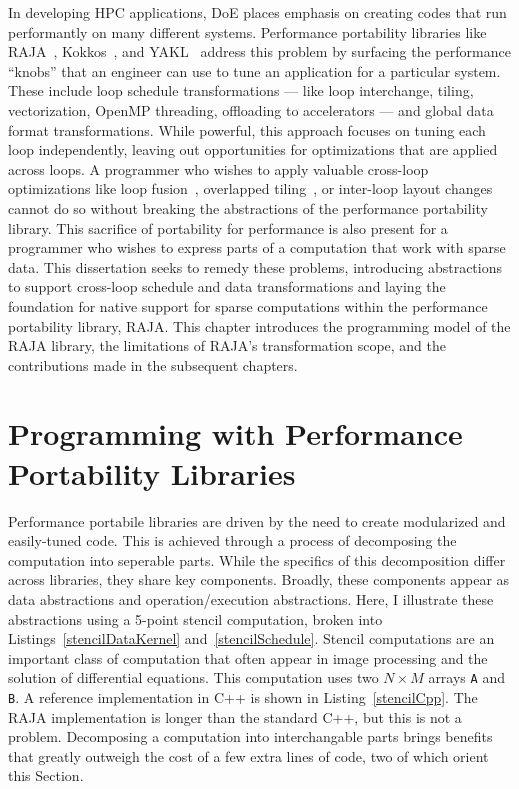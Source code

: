 In developing HPC applications, DoE places emphasis on creating codes that run performantly on many different systems.
Performance portability libraries like RAJA~\cite{hornung2014RAJA}, Kokkos~\cite{edwards2014kokkos}, and YAKL~\cite{norman2022portable} address this problem by surfacing the performance ``knobs'' that an engineer can use to tune an application for a particular system. 
These include loop schedule transformations --- like loop interchange, tiling, vectorization, OpenMP threading, offloading to accelerators --- and global data format transformations.
While powerful, this approach focuses on tuning each loop independently, leaving out opportunities for optimizations that are applied across loops.
A programmer who wishes to apply valuable cross-loop optimizations like loop fusion~\cite{mckinley1996improving}, overlapped tiling~\cite{bertolacci2019using,zhou2012hierarchical,CathieSC14}, or inter-loop layout changes~\cite{kennedy1995automatic,kennedy1998automatic} cannot do so without breaking the abstractions of the performance portability library.
This sacrifice of portability for performance is also present for a programmer who wishes to express parts of a computation that work with sparse data.
This dissertation seeks to remedy these problems, introducing abstractions to support cross-loop schedule and data transformations and laying the foundation for native support for sparse computations within the performance portability library, RAJA\@.
This chapter introduces the programming model of the RAJA library, the limitations of RAJA's transformation scope, and the contributions made in the subsequent chapters. 

\section{Programming with Performance Portability Libraries}

Performance portabile libraries are driven by the need to create modularized and easily-tuned code.
This is achieved through a process of decomposing the computation into seperable parts.
While the specifics of this decomposition differ across libraries, they share key components.
Broadly, these components appear as data abstractions and operation/execution abstractions.
Here, I illustrate these abstractions using a 5-point stencil computation, broken into Listings~\ref{stencilDataKernel} and~\ref{stencilSchedule}.
Stencil computations are an important class of computation that often appear in image processing and the solution of differential equations.
This computation uses two $N \times M$ arrays \verb.A. and \verb.B..
A reference implementation in C++ is shown in Listing~\ref{stencilCpp}.
The RAJA implementation is longer than the standard C++, but this is not a problem.
Decomposing a computation into interchangable parts brings benefits that greatly outweigh the cost of a few extra lines of code, two of which orient this Section.

